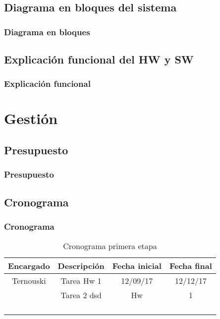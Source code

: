\subsection{Diagrama en bloques del sistema}
\begin{frame}
	\frametitle{Diagrama en bloques}

\end{frame}

\subsection{Explicación funcional del HW y SW}
\begin{frame}
	\frametitle{Explicación funcional}

\end{frame}

\section{Gestión}

\subsection{Presupuesto}
\begin{frame}
	\frametitle{Presupuesto}

\end{frame}

\subsection{Cronograma}
\begin{frame}
	\frametitle{Cronograma}
		\begin{table}[]
			\centering
			\caption{Cronograma primera etapa}
			\label{my-label}
			\begin{tabular}{cccc}
				Encargado & Descripción & Fecha inicial & Fecha final \\ \hline
				Ternouski & Tarea Hw 1  & 12/09/17       & 12/12/17    \\
 				          & Tarea  2 dsd     & Hw            & 1           \\
				          &             &               &             \\
				          &             &               &             \\
				          &             &               &             \\
				          &             &               &             \\ \hline
\end{tabular}
\end{table}
\end{frame}

